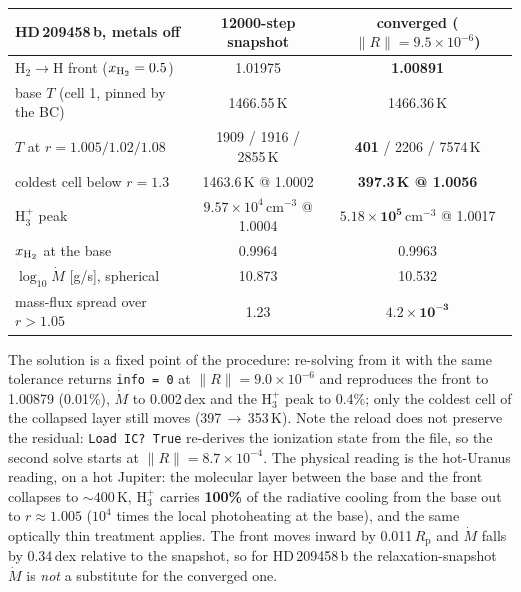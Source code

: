 \documentclass[english,a4paper]{my_memo}
\newcommand{\Rp}{R_{\mathrm{p}}}
\newcommand{\Mdot}{\dot{M}}
\begin{document}
\begin{center}\small
\begin{tabular}{@{}lcc@{}}
\toprule
HD\,209458\,b, metals off & 12000-step snapshot & converged ($\|R\|=9.5\times10^{-6}$) \\
\midrule
H$_2\to$H front ($x_{\rm H_2}=0.5$) & 1.01975 & \textbf{1.00891} \\
base $T$ (cell 1, pinned by the BC) & 1466.55\,K & 1466.36\,K \\
$T$ at $r=1.005/1.02/1.08$ & 1909 / 1916 / 2855\,K & \textbf{401} / 2206 / 7574\,K \\
coldest cell below $r=1.3$ & 1463.6\,K @ 1.0002 & \textbf{397.3\,K @ 1.0056} \\
H$_3^+$ peak & $9.57\times10^{4}$\,cm$^{-3}$ @ 1.0004 & $\mathbf{5.18\times10^{5}}$\,cm$^{-3}$ @ 1.0017 \\
$x_{\rm H_2}$ at the base & 0.9964 & 0.9963 \\
$\log_{10}\Mdot$ [g/s], spherical & 10.873 & 10.532 \\
mass-flux spread over $r>1.05$ & 1.23 & $\mathbf{4.2\times10^{-3}}$ \\
\bottomrule
\end{tabular}
\end{center}

\noindent The solution is a fixed point of the procedure: re-solving from it with
the same tolerance returns \texttt{info = 0} at $\|R\|=9.0\times10^{-6}$ and
reproduces the front to 1.00879 (0.01\%), $\Mdot$ to 0.002\,dex and the H$_3^+$
peak to 0.4\%; only the coldest cell of the collapsed layer still moves
(397\,$\to$\,353\,K). Note the reload does not preserve the residual:
\texttt{Load IC? True} re-derives the ionization state from the file, so the
second solve starts at $\|R\|=8.7\times10^{-4}$. The physical reading is the
hot-Uranus reading, on a hot Jupiter: the molecular layer between the base and the
front collapses to ${\sim}400$\,K, H$_3^+$ carries \textbf{100\%} of the radiative
cooling from the base out to $r\approx1.005$ ($10^{4}$ times the local
photoheating at the base), and the same optically thin treatment applies. The
front moves inward by 0.011\,$\Rp$ and $\Mdot$ falls by 0.34\,dex relative to the
snapshot, so for HD\,209458\,b the relaxation-snapshot $\Mdot$ is \emph{not} a
substitute for the converged one.
\end{document}
